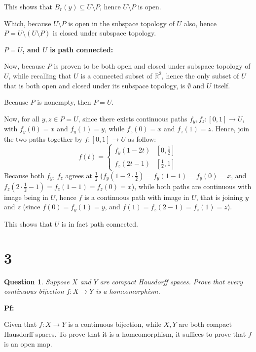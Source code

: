 \documentclass{article}
\newtheorem{question}{Question}
\begin{document}
This shows that $B_r(y)\subseteq U\setminus P$, hence $U\setminus P$ is open.

Which, because $U\setminus P$ is open in the subspace topology of $U$ also, hence $P=U\setminus (U\setminus P)$ is closed under subspace topology.

\hfil

\textbf{$P=U$, and $U$ is path connected:}

Now, because $P$ is proven to be both open and closed under subspace topology of $U$, while recalling that $U$ is a connected subset of $\mathbb{R}^2$,
hence the only subset of $U$ that is both open and closed under its subspace topology, is $\emptyset$ and $U$ itself.

Because $P$ is nonempty, then $P=U$.

Now, for all $y,z\in P=U$, since there exists continuous paths $f_y,f_z:[0,1]\rightarrow U$, with $f_y(0)=x$ and $f_y(1)=y$, while $f_z(0)=x$ and $f_z(1)=z$.
Hence, join the two paths together by $f:[0,1]\rightarrow U$ as follow:
$$f(t)=\begin{cases}
    f_y(1-2t) & [0,\frac{1}{2}]\\
    f_z(2t-1) & [\frac{1}{2},1]
\end{cases}$$
Because both $f_y$, $f_z$ agrees at $\frac{1}{2}$ ($f_y(1-2\cdot\frac{1}{2})=f_y(1-1)=f_y(0)=x$, and $f_z(2\cdot\frac{1}{2}-1)=f_z(1-1)=f_z(0)=x$), while both paths are continuous with image being in $U$,
hence $f$ is a continuous path with image in $U$, that is joining $y$ and $z$ (since $f(0)=f_y(1)=y$, and $f(1)=f_z(2-1)=f_z(1)=z$).

This shows that $U$ is in fact path connected.

\break 

\section*{3}
\begin{myBox}[]{}
    \begin{question}
        Suppose $X$ and $Y$ are compact Hausdorff spaces. Prove that every continuous
        bijection $f:X\rightarrow Y$ is a homeomorphism.
    \end{question}
\end{myBox}

\textbf{Pf:}

Given that $f:X\rightarrow Y$ is a continuous bijection, while $X,Y$ are both compact Hausdorff spaces.
To prove that it is a homeomorphism, it suffices to prove that $f$ is an open map.
\end{document}
